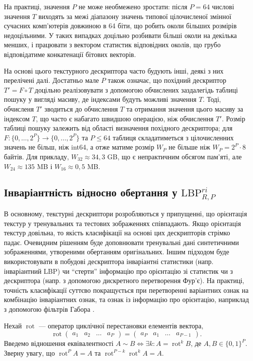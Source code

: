 На практиці, значення $P$ не може необмежено зростати: після $P=64$ числові значення $T$ виходять за межі діапазону значень типової цілочисленої змінної сучасних комп'ютерів довжиною в 64 біти, 
що робить околи більших розмірів недоцільними. У таких випадках доцільно розбивати більші околи на декілька менших, і працювати з вектором статистик відповідних околів,
що грубо відповідатиме конкатенації бітових векторів. 

На основі цього текстурного дескриптора часто будують інші, деякі з них перелічені далі.
Достатньо мале $P$ також означає, що похідний дескриптор $T' = F \circ T$ доцільно реалізовувати з допомогою обчислених заздалегідь таблиці пошуку у вигляді масиву, 
де індексами будуть можливі значення $T$.
Тоді, обчисленя $T'$ зводиться до обчислення $T$ та отримання значення цього масиву за індексом $T$, що часто є набагато швидшою операцією, ніж обчислення $T'$.
Розмір таблиці пошуку залежить від області визначення похідного дескриптора; 
для $F \colon \{0,\dots,2^P\} \to \{0,\dots,2^P\}$ та $P\le 64$ таблиця складатиметься з цілочисленних значень не більш, ніж int64, 
а отже матиме розмір $W_P$ не більше ніж $W_P = 2^P \cdot 8$ байтів. 
Для прикладу, $W_{32} \approx 34{,}3$ GB, що є непрактичним обсягом пам'яті, але $W_{24} \approx 135$ MB і $W_{16} \approx 0{,}5$ MB.

\subsection{Інваріантність відносно обертання у \(\mathrm{LBP}_{R,P}^{ri}\)}\label{section1.1c}\hfill

В основному, текстурні дескриптори розробляються у припущенні, що орієнтація текстур у тренувальних та тестових зображеннях співпадають.
Якщо орієнтація текстур довільна, то якість класифікації на основі цих дескрипторів стрімко падає. 
Очевидним рішенням буде доповнювати тренувальні дані синтетичними зображеннями, утвореними обертанням оригінальних. 
Іншим підходом буде використовувати в побудові дескриптора інваріантні статистики (напр. інваріантний LBP) чи 
``стерти'' інформацію про орієнтацію зі статистик чи з дескриптора (напр. з допомогою дискретного перетворення Фур'є). 
На практиці, точність класифікації суттєво покращується при перетворенні варіантних ознак на комбінацію інваріантних ознак, та ознак із інформацію про орієнтацію, наприклад з допомогою фільтрів Габора \cite{guo2010lbpv}. 

Нехай $\operatorname{rot}$ --- оператор циклічної перестановки елементів вектора,
\begin{equation*}
    \operatorname{rot} \begin{pmatrix}a_1 & a_2 & \dots  & a_P\end{pmatrix} = \begin{pmatrix}a_P & a_1 & \dots  & a_{P-1}\end{pmatrix}.
\end{equation*} 
Введемо відношення еквівалентності $A\sim B \iff \exists k: A = \operatorname{rot}^k B$, де $A,B \in \{0,1\}^P$.
Зверну увагу, що $\operatorname{rot}^P A = A$ та $\operatorname{rot}^{P-k} \operatorname{rot}^k A = A$.

